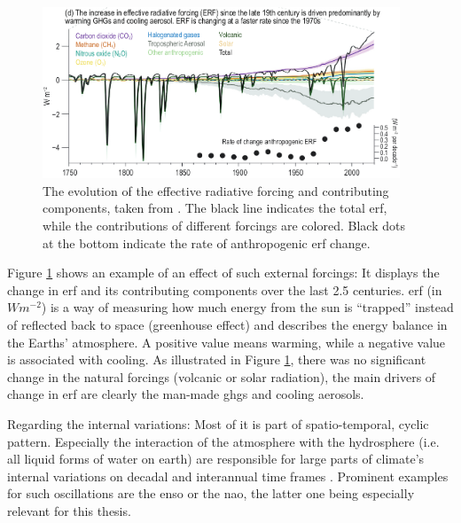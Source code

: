 \begin{figure}[htb]
  \begin{center}
    \includegraphics[width=0.95\textwidth]{figures/ERF_change_with_forcings.png}
  \end{center}
  \caption{The evolution of the effective radiative forcing and contributing components, taken from \cite{intergovernmental_panel_on_climate_change_ipcc_climate_2023}. The black line indicates the total \ac{erf}, while the contributions of different forcings are colored. Black dots at the bottom indicate the rate of anthropogenic \ac{erf} change.}
  \label{fig:erf-with-forcings}
\end{figure}

Figure \ref{fig:erf-with-forcings} shows an example of an effect of such external forcings: It displays the change in \ac{erf} and its contributing components over the last 2.5 centuries. 
\ac{erf} (in $Wm^{-2}$) is a way of measuring how much energy from the sun is \enquote{trapped} instead of reflected back to space (greenhouse effect) and describes the energy balance in the Earths' atmosphere. 
A positive value means warming, while a negative value is associated with cooling. 
As illustrated in  Figure \ref{fig:erf-with-forcings}, there was no significant change in the natural forcings (volcanic or solar radiation), the main drivers of change in \ac{erf} are clearly the man-made \acp{ghg} and cooling aerosols. \cite{intergovernmental_panel_on_climate_change_ipcc_climate_2023}

Regarding the internal variations: Most of it is part of spatio-temporal, cyclic pattern. Especially the interaction of the atmosphere with the hydrosphere (i.e. all liquid forms of water on earth) are responsible for large parts of climate's internal variations on decadal and interannual time frames \cite{vietinghoffdiss}. 
Prominent examples for such oscillations are the \ac{enso} or the \ac{nao}, the latter one being especially relevant for this thesis. 


